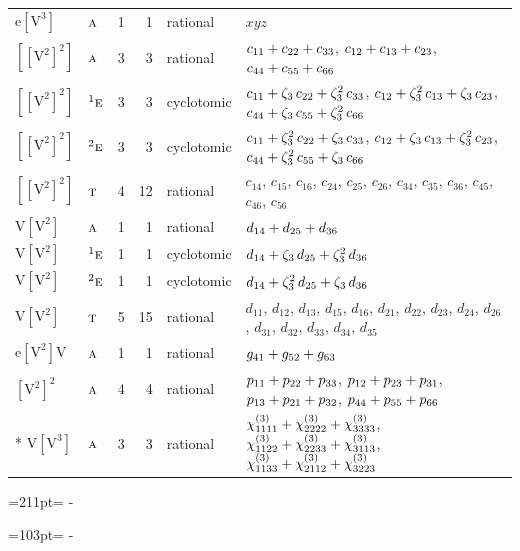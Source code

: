 \documentclass[10pt,a4paper]{article}
\newcommand{\needspace}[1]{\par\penalty-100\begingroup\dimen0=#1\relax\dimen2=\pagegoal
  \advance\dimen2-\pagetotal\ifdim\dimen0>\dimen2\relax\ifdim\dimen2>0pt\vfil\break\fi\fi
  \endgroup}
\numberwithin{equation}{section}
\newcommand{\irr}[1]{\text{\normalfont\scshape #1}}
\newcommand{\conjpair}[1]{{}^{#1}}
\newcommand{\rootunity}[1]{\zeta_{#1}}
\newcommand{\jahn}[1]{\mathrm{#1}}
\newlength{\fillwidth}\newlength{\cellwidth}\newlength{\colwidth}
\newcommand{\signbreak}{\penalty100\relax}
\begin{document}
{\begin{longtable}{@{}llrrl>{\RaggedRight\arraybackslash}p{\fillwidth}@{}}
$\jahn{e[V^{3}]}$ & $\irr{a}$ & 1 & 1 & rational & $xyz$\\
$\jahn{[[V^{2}]^{2}]}$ & $\irr{a}$ & 3 & 3 & rational & $c_{11} +\signbreak c_{22} +\signbreak c_{33}$, $c_{12} +\signbreak c_{13} +\signbreak c_{23}$, $c_{44} +\signbreak c_{55} +\signbreak c_{66}$\\
$\jahn{[[V^{2}]^{2}]}$ & $\conjpair{1}\irr{e}$ & 3 & 3 & cyclotomic & $c_{11} +\signbreak \rootunity{3}\,c_{22} +\signbreak \rootunity{3}^{2}\,c_{33}$, $c_{12} +\signbreak \rootunity{3}^{2}\,c_{13} +\signbreak \rootunity{3}\,c_{23}$, $c_{44} +\signbreak \rootunity{3}\,c_{55} +\signbreak \rootunity{3}^{2}\,c_{66}$\\
$\jahn{[[V^{2}]^{2}]}$ & $\conjpair{2}\irr{e}$ & 3 & 3 & cyclotomic & $c_{11} +\signbreak \rootunity{3}^{2}\,c_{22} +\signbreak \rootunity{3}\,c_{33}$, $c_{12} +\signbreak \rootunity{3}\,c_{13} +\signbreak \rootunity{3}^{2}\,c_{23}$, $c_{44} +\signbreak \rootunity{3}^{2}\,c_{55} +\signbreak \rootunity{3}\,c_{66}$\\
$\jahn{[[V^{2}]^{2}]}$ & $\irr{t}$ & 4 & 12 & rational & $c_{14}$, $c_{15}$, $c_{16}$, $c_{24}$, $c_{25}$, $c_{26}$, $c_{34}$, $c_{35}$, $c_{36}$, $c_{45}$, $c_{46}$, $c_{56}$\\
$\jahn{V[V^{2}]}$ & $\irr{a}$ & 1 & 1 & rational & $d_{14} +\signbreak d_{25} +\signbreak d_{36}$\\
$\jahn{V[V^{2}]}$ & $\conjpair{1}\irr{e}$ & 1 & 1 & cyclotomic & $d_{14} +\signbreak \rootunity{3}\,d_{25} +\signbreak \rootunity{3}^{2}\,d_{36}$\\
$\jahn{V[V^{2}]}$ & $\conjpair{2}\irr{e}$ & 1 & 1 & cyclotomic & $d_{14} +\signbreak \rootunity{3}^{2}\,d_{25} +\signbreak \rootunity{3}\,d_{36}$\\
$\jahn{V[V^{2}]}$ & $\irr{t}$ & 5 & 15 & rational & $d_{11}$, $d_{12}$, $d_{13}$, $d_{15}$, $d_{16}$, $d_{21}$, $d_{22}$, $d_{23}$, $d_{24}$, $d_{26}$, $d_{31}$, $d_{32}$, $d_{33}$, $d_{34}$, $d_{35}$\\
$\jahn{e[V^{2}]V}$ & $\irr{a}$ & 1 & 1 & rational & $\mathnormal{g}_{41} +\signbreak \mathnormal{g}_{52} +\signbreak \mathnormal{g}_{63}$\\
$\jahn{[V^{2}]^{2}}$ & $\irr{a}$ & 4 & 4 & rational & $p_{11} +\signbreak p_{22} +\signbreak p_{33}$, $p_{12} +\signbreak p_{23} +\signbreak p_{31}$, $p_{13} +\signbreak p_{21} +\signbreak p_{32}$, $p_{44} +\signbreak p_{55} +\signbreak p_{66}$\\*
$\jahn{V[V^{3}]}$ & $\irr{a}$ & 3 & 3 & rational & $\chi^{(3)}_{1111} +\signbreak \chi^{(3)}_{2222} +\signbreak \chi^{(3)}_{3333}$, $\chi^{(3)}_{1122} +\signbreak \chi^{(3)}_{2233} +\signbreak \chi^{(3)}_{3113}$, $\chi^{(3)}_{1133} +\signbreak \chi^{(3)}_{2112} +\signbreak \chi^{(3)}_{3223}$\\
\bottomrule\end{longtable}}
\needspace{211pt}
\needspace{103pt}
\end{document}
